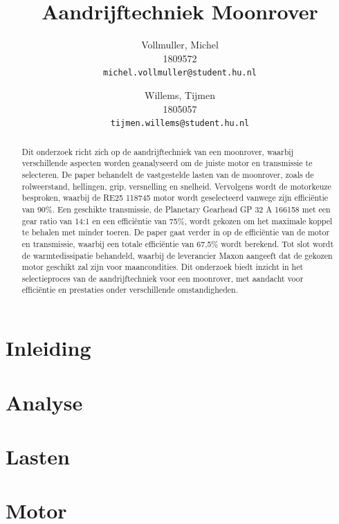 \documentclass{article}
\title{Aandrijftechniek Moonrover}
\author{
  Vollmuller, Michel\\
  1809572\\
  \texttt{michel.vollmuller@student.hu.nl}
  \and
  Willems, Tijmen\\
  1805057\\
  \texttt{tijmen.willems@student.hu.nl}
}
\begin{document}
\maketitle

\begin{abstract}
  Dit onderzoek richt zich op de aandrijftechniek van een moonrover, waarbij verschillende aspecten worden geanalyseerd om de juiste motor en transmissie te selecteren. De paper behandelt de vastgestelde lasten van de moonrover, zoals de rolweerstand, hellingen, grip, versnelling en snelheid. Vervolgens wordt de motorkeuze besproken, waarbij de RE25 118745 motor wordt geselecteerd vanwege zijn efficiëntie van 90\%. Een geschikte transmissie, de Planetary Gearhead GP 32 A 166158 met een gear ratio van 14:1 en een efficiëntie van 75\%, wordt gekozen om het maximale koppel te behalen met minder toeren. De paper gaat verder in op de efficiëntie van de motor en transmissie, waarbij een totale efficiëntie van 67,5\% wordt berekend. Tot slot wordt de warmtedissipatie behandeld, waarbij de leverancier Maxon aangeeft dat de gekozen motor geschikt zal zijn voor maancondities. Dit onderzoek biedt inzicht in het selectieproces van de aandrijftechniek voor een moonrover, met aandacht voor efficiëntie en prestaties onder verschillende omstandigheden.
\end{abstract}

\tableofcontents

\newpage

\section{Inleiding}


\section{Analyse} 


\newpage

\section{Lasten}


\newpage

\section{Motor}


\newpage
\end{document}
